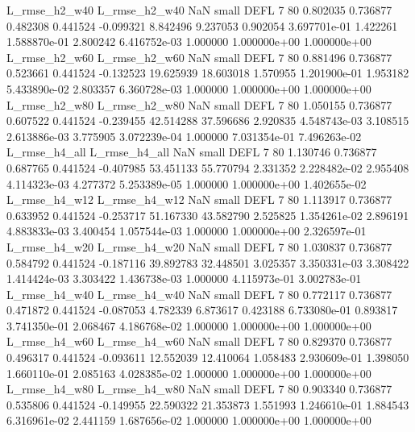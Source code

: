 L_rmse_h2_w40  L_rmse_h2_w40                   NaN      small     DEFL                 7 80 0.802035       0.736877 0.482308       0.441524   -0.099321      8.842496      9.237053     0.902054   3.697701e-01  1.422261 1.588870e-01     2.800242   6.416752e-03            1.000000    1.000000e+00        1.000000e+00
 L_rmse_h2_w60  L_rmse_h2_w60                   NaN      small     DEFL                 7 80 0.881496       0.736877 0.523661       0.441524   -0.132523     19.625939     18.603018     1.570955   1.201900e-01  1.953182 5.433890e-02     2.803357   6.360728e-03            1.000000    1.000000e+00        1.000000e+00
 L_rmse_h2_w80  L_rmse_h2_w80                   NaN      small     DEFL                 7 80 1.050155       0.736877 0.607522       0.441524   -0.239455     42.514288     37.596686     2.920835   4.548743e-03  3.108515 2.613886e-03     3.775905   3.072239e-04            1.000000    7.031354e-01        7.496263e-02
 L_rmse_h4_all  L_rmse_h4_all                   NaN      small     DEFL                 7 80 1.130746       0.736877 0.687765       0.441524   -0.407985     53.451133     55.770794     2.331352   2.228482e-02  2.955408 4.114323e-03     4.277372   5.253389e-05            1.000000    1.000000e+00        1.402655e-02
 L_rmse_h4_w12  L_rmse_h4_w12                   NaN      small     DEFL                 7 80 1.113917       0.736877 0.633952       0.441524   -0.253717     51.167330     43.582790     2.525825   1.354261e-02  2.896191 4.883833e-03     3.400454   1.057544e-03            1.000000    1.000000e+00        2.326597e-01
 L_rmse_h4_w20  L_rmse_h4_w20                   NaN      small     DEFL                 7 80 1.030837       0.736877 0.584792       0.441524   -0.187116     39.892783     32.448501     3.025357   3.350331e-03  3.308422 1.414424e-03     3.303422   1.436738e-03            1.000000    4.115973e-01        3.002783e-01
 L_rmse_h4_w40  L_rmse_h4_w40                   NaN      small     DEFL                 7 80 0.772117       0.736877 0.471872       0.441524   -0.087053      4.782339      6.873617     0.423188   6.733080e-01  0.893817 3.741350e-01     2.068467   4.186768e-02            1.000000    1.000000e+00        1.000000e+00
 L_rmse_h4_w60  L_rmse_h4_w60                   NaN      small     DEFL                 7 80 0.829370       0.736877 0.496317       0.441524   -0.093611     12.552039     12.410064     1.058483   2.930609e-01  1.398050 1.660110e-01     2.085163   4.028385e-02            1.000000    1.000000e+00        1.000000e+00
 L_rmse_h4_w80  L_rmse_h4_w80                   NaN      small     DEFL                 7 80 0.903340       0.736877 0.535806       0.441524   -0.149955     22.590322     21.353873     1.551993   1.246610e-01  1.884543 6.316961e-02     2.441159   1.687656e-02            1.000000    1.000000e+00        1.000000e+00
